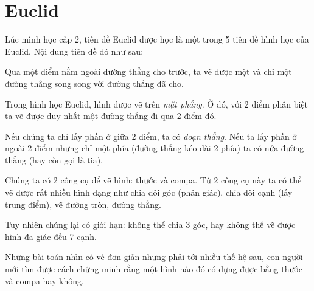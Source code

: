 \chapter{Euclid}

Lúc mình học cấp 2, tiên đề Euclid được học là một trong 5 tiên đề hình học của Euclid. Nội dung tiên đề đó như sau:

\begin{axiom}
    Qua một điểm nằm ngoài đường thẳng cho trước, ta vẽ được một và chỉ một đường thẳng song song với đường thẳng đã cho.
\end{axiom}

Trong hình học Euclid, hình được vẽ trên \textit{mặt phẳng}. Ở đó, với 2 điểm phân biệt ta vẽ được duy nhất một đường thẳng đi qua 2 điểm đó.

Nếu chúng ta chỉ lấy phần ở giữa 2 điểm, ta có \textit{đoạn thẳng}. Nếu ta lấy phần ở ngoài 2 điểm nhưng chỉ một phía (đường thẳng kéo dài 2 phía) ta có nửa đường thẳng (hay còn gọi là tia).

Chúng ta có 2 công cụ để vẽ hình: thước và compa. Từ 2 công cụ này ta có thể vẽ được rất nhiều hình dạng như chia đôi góc (phân giác), chia đôi cạnh (lấy trung điểm), vẽ đường tròn, đường thẳng.

Tuy nhiên chúng lại có giới hạn: không thể chia 3 góc, hay không thể vẽ được hình đa giác đều 7 cạnh.

Những bài toán nhìn có vẻ đơn giản nhưng phải tới nhiều thế hệ sau, con người mới tìm được cách chứng minh rằng một hình nào đó có dựng được bằng thước và compa hay không.

